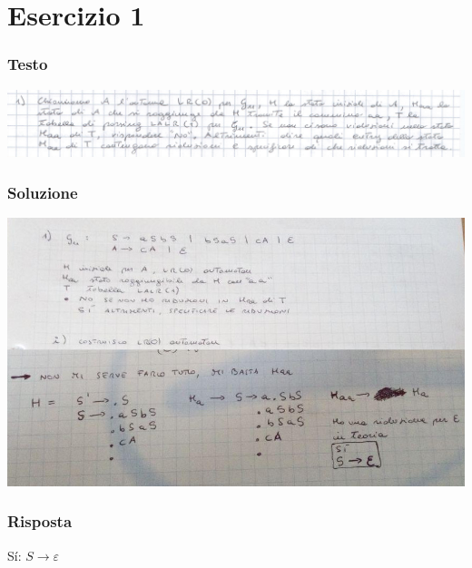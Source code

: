 \chapter{Esercizio 1}

\subsection{Testo}

\begin{center}
    \includegraphics[scale=0.2]{Chapters/Img/01text.png}\\
\end{center} 

\subsection{Soluzione}

\begin{center}
    \includegraphics[scale=0.6]{Chapters/Img/01solution.png}\\
\end{center} 

\subsection{Risposta}
S\'i: $S \rightarrow \varepsilon$